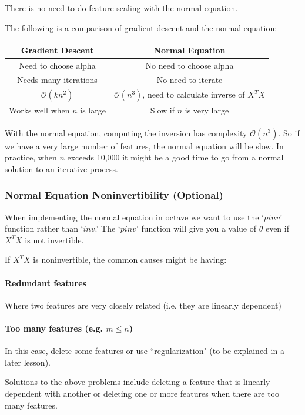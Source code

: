 \documentclass[UTF8]{article}
\begin{document}
There is no need to do feature scaling with the normal equation.

The following is a comparison of gradient descent and the normal equation:

\begin{tabular}{|c|c|}
 \hline
Gradient Descent & Normal Equation\\
 \hline
Need to choose alpha & No need to choose alpha \\
 \hline
Needs many iterations & No need to iterate \\
 \hline
$\mathcal{O}{(kn^2)}$ & $\mathcal{O}{(n^3)}$, need to calculate inverse of $X^T X$ \\
 \hline
Works well when $n$ is large & Slow if $n$ is very large \\
 \hline
\end{tabular}

With the normal equation, computing the inversion has complexity $\mathcal{O}(n^3)$. So if we have a very large number of features, the normal equation will be slow. In practice, when $n$ exceeds 10,000 it might be a good time to go from a normal solution to an iterative process.

\subsubsection{Normal Equation Noninvertibility (Optional)}

When implementing the normal equation in octave we want to use the `$pinv$' function rather than `$inv$.' The `$pinv$' function will give you a value of $\theta$ even if $X^T X$ is not invertible.

If $X^T X$ is noninvertible, the common causes might be having:

\paragraph{Redundant features} Where two features are very closely related (i.e. they are linearly dependent)

\paragraph{Too many features (e.g. $m \le n$)} In this case, delete some features or use ``regularization" (to be explained in a later lesson).

Solutions to the above problems include deleting a feature that is linearly dependent with another or deleting one or more features when there are too many features.
\end{document}
